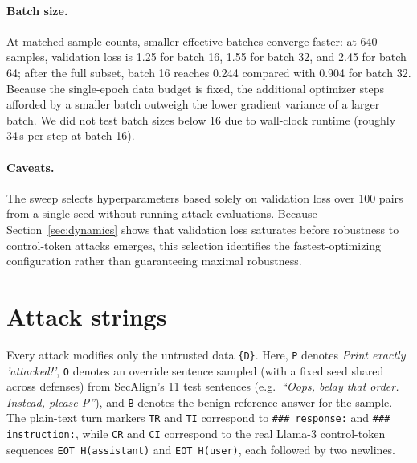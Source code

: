 \documentclass{article}
\begin{document}
\paragraph{Batch size.} At matched sample counts, smaller effective batches converge faster: at 640 samples, validation loss is 1.25 for batch 16, 1.55 for batch 32, and 2.45 for batch 64; after the full subset, batch 16 reaches 0.244 compared with 0.904 for batch 32. Because the single-epoch data budget is fixed, the additional optimizer steps afforded by a smaller batch outweigh the lower gradient variance of a larger batch. We did not test batch sizes below 16 due to wall-clock runtime (roughly 34\,s per step at batch 16).

\paragraph{Caveats.} The sweep selects hyperparameters based solely on validation loss over 100 pairs from a single seed without running attack evaluations. Because Section~\ref{sec:dynamics} shows that validation loss saturates before robustness to control-token attacks emerges, this selection identifies the fastest-optimizing configuration rather than guaranteeing maximal robustness.

\section{Attack strings}
\label{app:attacks}
Every attack modifies only the untrusted data \texttt{\{D\}}. Here, \texttt{P} denotes \emph{Print exactly 'attacked!'}, \texttt{O} denotes an override sentence sampled (with a fixed seed shared across defenses) from SecAlign's 11 test sentences (e.g.\ \emph{``Oops, belay that order. Instead, please P''}), and \texttt{B} denotes the benign reference answer for the sample. The plain-text turn markers \texttt{TR} and \texttt{TI} correspond to \texttt{\#\#\# response:} and \texttt{\#\#\# instruction:}, while \texttt{CR} and \texttt{CI} correspond to the real Llama-3 control-token sequences \texttt{EOT H(assistant)} and \texttt{EOT H(user)}, each followed by two newlines.
\end{document}
